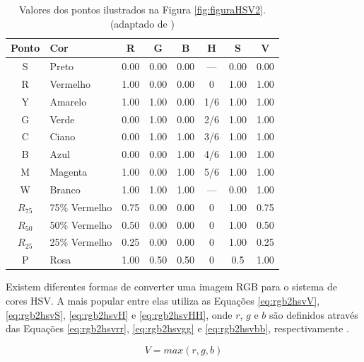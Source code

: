 \documentclass[	12pt, Times, openright, twoside, a4paper, english, brazil]{abntex2}
\begin{document}
\begin{table}[ht]
\centering
\begin{tabular}{clcccccc}
\hline      

\textbf{Ponto} & \textbf{Cor}              & \textbf{R} & \textbf{G} & \textbf{B} & \textbf{H} & \textbf{S} & \textbf{V}      \\ \hline
            S 	& Preto 		&0.00 	&0.00 	&0.00 	&— 	&0.00 	&0.00	\\ \hline
            R 	& Vermelho 		&1.00 	&0.00 	&0.00 	&0 	&1.00 	&1.00	\\ \hline
            Y 	&Amarelo 	&1.00 	&1.00 	&0.00 	&1/6 &1.00 	&1.00	\\ \hline
            G 	&Verde 		&0.00 	&1.00 	&0.00 	&2/6 &1.00 	&1.00	\\ \hline
            C 	&Ciano 		&0.00 	&1.00 	&1.00 	&3/6 &1.00 	&1.00	\\ \hline
            B 	&Azul 		&0.00 	&0.00 	&1.00 	&4/6 &1.00 	&1.00	\\ \hline
            M 	&Magenta 	&1.00 	&0.00 	&1.00 	&5/6 &1.00 	&1.00	\\ \hline
            W 	&Branco 		&1.00 	&1.00 	&1.00 	&— 	&0.00 	&1.00	\\ \hline
            $R_{75}$ &75\% Vermelho 	&0.75 	&0.00 	&0.00 	&0 	&1.00 	&0.75	\\ \hline
            $R_{50}$ &50\% Vermelho 	&0.50 	&0.00 	&0.00 	&0 	&1.00 	&0.50	\\ \hline
            $R_{25}$ &25\% Vermelho 	&0.25 	&0.00 	&0.00 	&0 	&1.00 	&0.25	\\ \hline
            P 	&Rosa 		&1.00 	&0.50 	&0.50 	&0 	&0.5 	&1.00	\\ \hline

\end{tabular}
\caption{Valores dos pontos ilustrados na Figura \ref{fig:figuraHSV2}. (adaptado de )}
\label{tab:exemploHSV}
\end{table}

Existem diferentes formas de converter uma imagem RGB para o sistema de cores HSV. A mais popular entre elas utiliza as Equações \ref{eq:rgb2hsvV}, \ref{eq:rgb2hsvS},  \ref{eq:rgb2hsvH} e \ref{eq:rgb2hsvHH}, onde $r$, $g$ e $b$ são definidos através das Equações \ref{eq:rgb2hsvrr}, \ref{eq:rgb2hsvgg} e \ref{eq:rgb2hsvbb}, respectivamente \cite{acharya2005image}.


\begin{equation}
\label{eq:rgb2hsvV}
V = max(r,g,b)
\end{equation}
\end{document}
